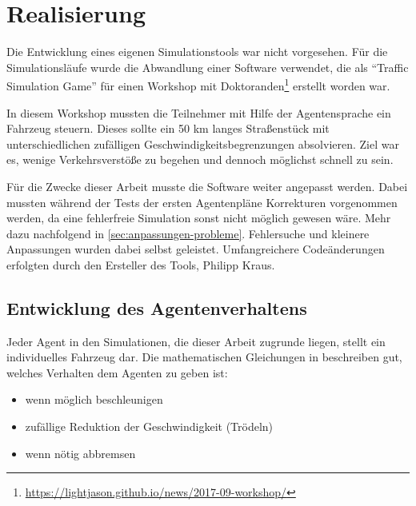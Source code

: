 \section{Realisierung}
\label{sec:realisierung}

Die Entwicklung eines eigenen Simulationstools war nicht vorgesehen.
Für die Simulationsläufe wurde die Abwandlung einer Software verwendet, die als \enquote{Traffic Simulation Game} für einen Workshop mit Doktoranden\footnote{\url{https://lightjason.github.io/news/2017-09-workshop/}} erstellt worden war.

In diesem Workshop mussten die Teilnehmer mit Hilfe der Agentensprache ein Fahrzeug steuern. Dieses sollte ein 50 km langes Straßenstück mit unterschiedlichen zufälligen Geschwindigkeitsbegrenzungen absolvieren. Ziel war es, wenige Verkehrsverstöße zu begehen und dennoch möglichst schnell zu sein.

Für die Zwecke dieser Arbeit musste die Software weiter angepasst werden.
Dabei mussten während der Tests der ersten Agentenpläne Korrekturen vorgenommen werden, da eine fehlerfreie Simulation sonst nicht möglich gewesen wäre. 
Mehr dazu nachfolgend in \cref{sec:anpassungen-probleme}.
Fehlersuche und kleinere Anpassungen wurden dabei selbst geleistet.
Umfangreichere Codeänderungen erfolgten durch den Ersteller des Tools, Philipp Kraus.







\subsection{Entwicklung des Agentenverhaltens}%
\label{sec:entwicklung-agentenplan}

Jeder Agent in den Simulationen, die dieser Arbeit zugrunde liegen, stellt ein individuelles Fahrzeug dar.
Die mathematischen Gleichungen in \cite{na-sch} beschreiben gut, welches Verhalten dem Agenten zu geben ist: 
\begin{itemize}
\itemsep0em
	\item wenn möglich beschleunigen
	\item zufällige Reduktion der Geschwindigkeit (Trödeln)
	\item wenn nötig abbremsen
\end{itemize}



